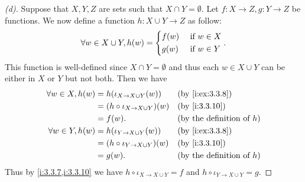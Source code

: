 \begin{proof}[(d)]
  Suppose that \(X, Y, Z\) are sets such that \(X \cap Y = \emptyset\).
  Let \(f : X \to Z, g : Y \to Z\) be functions.
  We now define a function \(h : X \cup Y \to Z\) as follow:
  \[
    \forall w \in X \cup Y, h(w) = \begin{dcases}
      f(w) & \text{ if } w \in X \\
      g(w) & \text{ if } w \in Y
    \end{dcases}.
  \]
  This function is well-defined since \(X \cap Y = \emptyset\) and thus each \(w \in X \cup Y\) can be either in \(X\) or \(Y\) but not both.
  Then we have
  \begin{align*}
    \forall w \in X, h(w) & = h(\iota_{X \to X \cup Y}(w))        &  & \by{i:ex:3.3.8}                     \\
                          & = (h \circ \iota_{X \to X \cup Y})(w) &  & \by{i:3.3.10}                       \\
                          & = f(w).                               &  & \text{(by the definition of \(h\))} \\
    \forall w \in Y, h(w) & = h(\iota_{Y \to X \cup Y}(w))        &  & \by{i:ex:3.3.8}                     \\
                          & = (h \circ \iota_{Y \to X \cup Y})(w) &  & \by{i:3.3.10}                       \\
                          & = g(w).                               &  & \text{(by the definition of \(h\))}
  \end{align*}
  Thus by \cref{i:3.3.7,i:3.3.10} we have \(h \circ \iota_{X \to X \cup Y} = f\) and \(h \circ \iota_{Y \to X \cup Y} = g\).


\end{proof}
